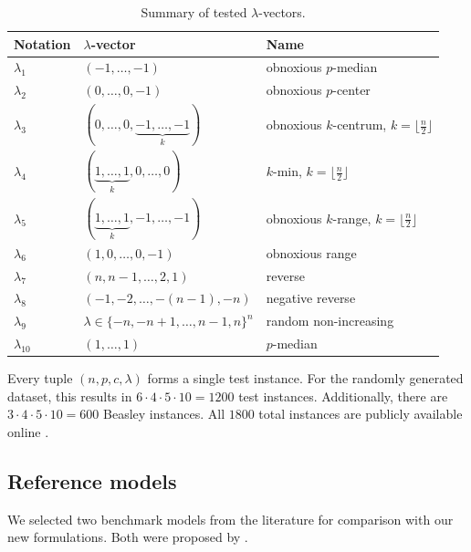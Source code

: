 \documentclass[letterpaper]{article}
\begin{document}
\begin{table}[H]
    \centering
    \scriptsize
    \begin{tabular}{lll}
        \hline
        \textbf{Notation} & \textbf{$\lambda$-vector} & \textbf{Name} \\ \hline
        $\lambda_1$ & $(-1, \dots, -1)$ & obnoxious $p$-median \\ 
        $\lambda_2$ & $(0, \dots, 0, -1)$ & obnoxious $p$-center \\ 
        $\lambda_3$ & $(0, \dots, 0, \underbrace{-1, \dots, -1}_k)$ & obnoxious $k$-centrum, $k = \lfloor \frac{n}{2} \rfloor$ \\
        $\lambda_4$ & $(\underbrace{1, \dots, 1}_k, 0, \dots, 0)$ & $k$-min, $k = \lfloor \frac{n}{2} \rfloor$ \\
        $\lambda_5$ & $(\underbrace{1, \dots, 1}_k, -1, \dots, -1)$ & obnoxious $k$-range, $k = \lfloor \frac{n}{2} \rfloor$ \\
        $\lambda_6$ & $(1, 0, \dots, 0, -1)$ & obnoxious range \\
        $\lambda_7$ & $(n, n-1, \dots, 2, 1)$ & reverse \\
        $\lambda_8$ & $(-1, -2, \dots, -(n-1), -n)$ & negative reverse \\
        $\lambda_9$ & $\lambda \in \{-n, -n+1, \dots, n-1, n\}^n$ & random non-increasing \\
        $\lambda_{10}$ & $(1, \dots, 1)$ & $p$-median \\
        \hline
    \end{tabular}
    \caption{Summary of tested $\lambda$-vectors.}
    \label{tab:lambdas}
\end{table}

Every tuple $(n, p, c, \lambda)$ forms a single test instance. For the randomly generated dataset, this results in $6 \cdot 4 \cdot 5 \cdot 10 = 1200$ test instances. Additionally, there are $3 \cdot 4 \cdot 5 \cdot 10 = 600$ Beasley instances. All $1800$ total instances are publicly available online \citep{instances2026dataset}.


\subsection{Reference models}\label{sec:reference_models}
We selected two benchmark models from the literature for comparison with our new formulations. Both were proposed by \citet{ljubic_benders_2024}.
\end{document}
